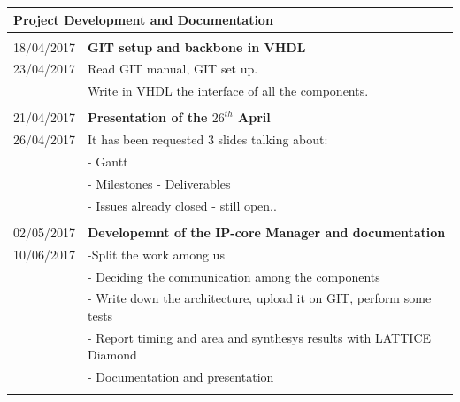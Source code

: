 \begin{table}
	\begin{tabular}{p{2.1cm}|  p{13.5cm}}
		\multicolumn{2}{p{15.0cm}}{ \LARGE{{Project Development and Documentation}}}\\
		\hline \hline 
		\multicolumn{2}{p{1.0cm}}{ \Large{{}}}\\
		18/04/2017 & \textbf{GIT setup and backbone in VHDL}\\
		23/04/2017& Read GIT manual, GIT set up.\\
		 &Write in VHDL the interface of all the components.\\
		\multicolumn{2}{p{1.0cm}}{ \Large{{ }}}\\	
		21/04/2017 & \textbf{Presentation of the $ 26^{th} $ April}	 \\
		26/04/2017 & It has been requested 3 slides talking about:\\
		& \quad- Gantt\\
			&\quad- Milestones - Deliverables\\
			&\quad- Issues already closed - still open..\\

	\multicolumn{2}{p{1.0cm}}{ \Large{{}}}\\
		02/05/2017 & \textbf{Developemnt of the IP-core Manager and documentation}\\
		10/06/2017&-Split the work among us\\
			& - Deciding the communication among the components\\
			& - Write down the architecture, upload it on GIT, perform some tests\\
			& - Report timing and area and synthesys results with LATTICE Diamond\\
			& - Documentation and presentation\\
		\multicolumn{2}{p{1.0cm}}{ \Large{{ }}}\\	
		
	\end{tabular}
\end{table}	
